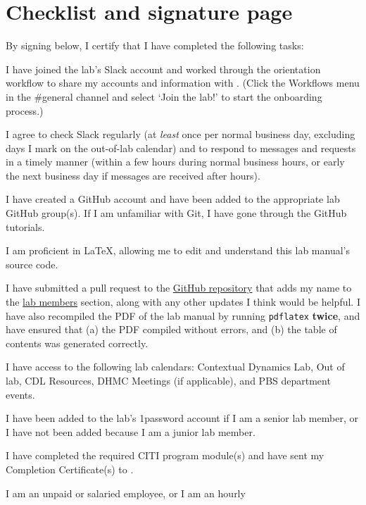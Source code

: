 \documentclass{tufte-book} %
\begin{document}
\chapter{Checklist and signature page}

   By signing below, I certify that I have completed the following tasks:
   \begin{todolist}
     \item I have joined the lab's Slack account and worked through the
    orientation workflow to share my accounts and information with
    \director.  (Click the Workflows menu in
    the \#general channel and select `Join the lab!' to start the
    onboarding process.)
    \item I agree to check Slack
    regularly (at \textit{least} once per normal business day, excluding days I
    mark on the out-of-lab calendar) and to respond to messages and
    requests in a timely manner (within a few hours during normal
    business hours, or early the next business day if messages are
    received after hours).
  \item I have created a GitHub account and have been added to the appropriate lab
    GitHub group(s).  If I am unfamiliar with Git, I have gone through
    the GitHub tutorials.
  \item I am proficient in \LaTeX, allowing me to edit and understand
  this lab manual's source code.
\item I have submitted a pull request to the
  \href{https://github.com/ContextLab/lab-manual}{GitHub repository}
  that adds my name to the \hyperref[sec:curr_members]{lab members}
  section, along with any other updates I think would be helpful.  I
  have also recompiled the PDF of the lab manual by running
  \texttt{pdflatex} \textbf{twice}, and have ensured that (a) the PDF compiled
  without errors, and (b) the table of contents was generated correctly.
  \item I have access to the following lab calendars:
    Contextual Dynamics Lab, Out of lab, CDL Resources, DHMC Meetings (if
    applicable), and PBS department events.
  \item I have been added to the lab's 1password account if I am a
    senior lab member, or I have not been added because I am a junior
    lab member.
  \item I have completed the required CITI program module(s) and have
    sent my Completion Certificate(s) to \coordinator.
  \item I am an unpaid or salaried employee, or I am an hourly

\end{todolist}
\end{document}
